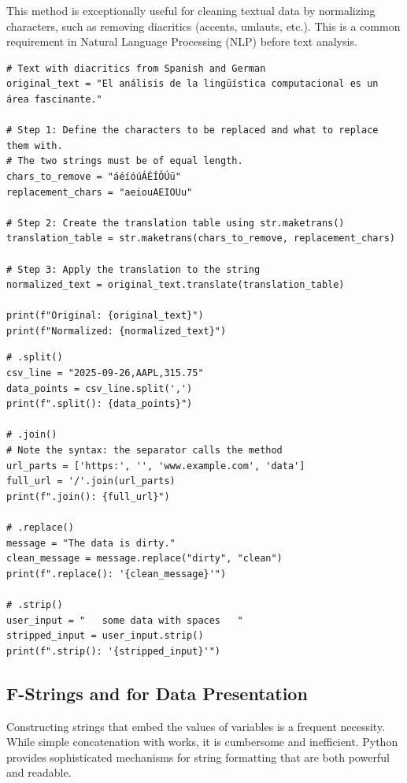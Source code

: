 \begin{example}
This method is exceptionally useful for cleaning textual data by normalizing characters, such as removing diacritics (accents, umlauts, etc.). This is a common requirement in Natural Language Processing (NLP) before text analysis.
\text{ }\begin{verbatim}
# Text with diacritics from Spanish and German
original_text = "El análisis de la lingüística computacional es un área fascinante."

# Step 1: Define the characters to be replaced and what to replace them with.
# The two strings must be of equal length.
chars_to_remove = "áéíóúÁÉÍÓÚü"
replacement_chars = "aeiouAEIOUu"

# Step 2: Create the translation table using str.maketrans()
translation_table = str.maketrans(chars_to_remove, replacement_chars)

# Step 3: Apply the translation to the string
normalized_text = original_text.translate(translation_table)

print(f"Original: {original_text}")
print(f"Normalized: {normalized_text}")
\end{verbatim}
\end{example}

\begin{example}\text{ }
\text{ }\begin{verbatim}
# .split()
csv_line = "2025-09-26,AAPL,315.75"
data_points = csv_line.split(',')
print(f".split(): {data_points}")

# .join()
# Note the syntax: the separator calls the method
url_parts = ['https:', '', 'www.example.com', 'data']
full_url = '/'.join(url_parts)
print(f".join(): {full_url}")

# .replace()
message = "The data is dirty."
clean_message = message.replace("dirty", "clean")
print(f".replace(): '{clean_message}'")

# .strip()
user_input = "   some data with spaces   "
stripped_input = user_input.strip()
print(f".strip(): '{stripped_input}'")
\end{verbatim}
\end{example}

\subsection{F-Strings and  for Data Presentation}
\label{subsec:string_formatting}
Constructing strings that embed the values of variables is a frequent necessity. While simple concatenation with \code{+} works, it is cumbersome and inefficient. Python provides sophisticated mechanisms for string formatting that are both powerful and readable.

